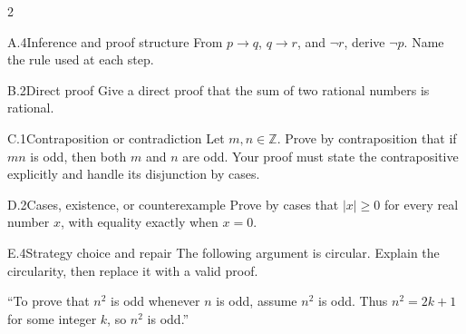 \documentclass[9pt]{extarticle}
\begin{document}
\begin{multicols}{2}
\begin{CoreProblem}{A.4}{Inference and proof structure}
From $p\to q$, $q\to r$, and $\neg r$, derive $\neg p$. Name the rule used at
each step.
\end{CoreProblem}
\begin{CoreProblem}{B.2}{Direct proof}
Give a direct proof that the sum of two rational numbers is rational.
\end{CoreProblem}
\begin{CoreProblem}{C.1}{Contraposition or contradiction}
Let $m,n\in\mathbb Z$. Prove by contraposition that if $mn$ is odd, then both
$m$ and $n$ are odd. Your proof must state the contrapositive explicitly and
handle its disjunction by cases.
\end{CoreProblem}
\columnbreak
\begin{CoreProblem}{D.2}{Cases, existence, or counterexample}
Prove by cases that $|x|\ge 0$ for every real number $x$, with equality exactly when $x=0$.
\end{CoreProblem}
\begin{CoreProblem}{E.4}{Strategy choice and repair}
The following argument is circular. Explain the circularity, then replace it with a valid proof.

``To prove that $n^2$ is odd whenever $n$ is odd, assume $n^2$ is odd. Thus
$n^2=2k+1$ for some integer $k$, so $n^2$ is odd.''
\end{CoreProblem}
\end{multicols}
\CoreWorkArea
\FormBreak
{}
\end{document}
